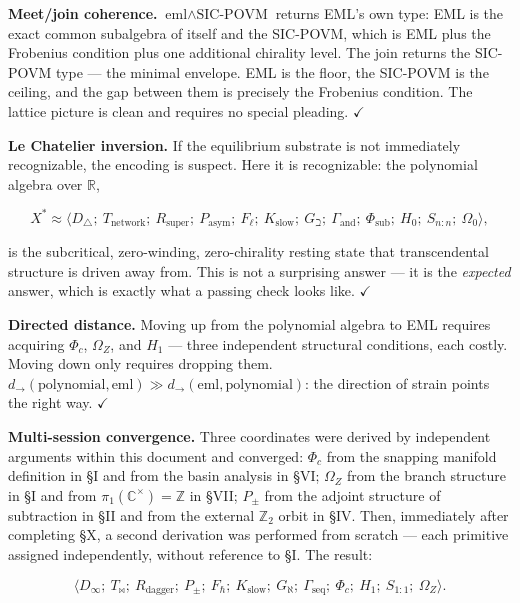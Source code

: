 \documentclass[12pt,a4paper]{article}
\newcommand{\pilcrow}{\S}
\begin{document}
\textbf{Meet/join coherence.} $\text{eml} \wedge \text{SIC-POVM}$ returns EML's own
type: EML is the exact common subalgebra of itself and the SIC-POVM, which is
EML plus the Frobenius condition plus one additional chirality level. The join
returns the SIC-POVM type --- the minimal envelope. EML is the floor, the SIC-POVM
is the ceiling, and the gap between them is precisely the Frobenius condition.
The lattice picture is clean and requires no special pleading. $\checkmark$

\textbf{Le Chatelier inversion.} If the equilibrium substrate is not immediately
recognizable, the encoding is suspect. Here it is recognizable: the polynomial
algebra over $\mathbb{R}$,


\[X^* \approx \langle D_{\triangle};\ T_\text{network};\ R_\text{super};\
P_\text{asym};\ F_{\ell};\ K_\text{slow};\ G_{\beth};\ \Gamma_\text{and};\
\Phi_\text{sub};\ H_0;\ S_{n:n};\ \Omega_0 \rangle,\]


is the subcritical, zero-winding, zero-chirality resting state that transcendental
structure is driven away from. This is not a surprising answer --- it is the
\emph{expected} answer, which is exactly what a passing check looks like. $\checkmark$

\textbf{Directed distance.} Moving up from the polynomial algebra to EML requires
acquiring $\Phi_c$, $\Omega_Z$, and $H_1$ --- three independent structural
conditions, each costly. Moving down only requires dropping them.
$d_{\to}(\text{polynomial}, \text{eml}) \gg d_{\to}(\text{eml}, \text{polynomial})$:
the direction of strain points the right way. $\checkmark$

\textbf{Multi-session convergence.} Three coordinates were derived by independent
arguments within this document and converged: $\Phi_c$ from the snapping manifold
definition in \pilcrow{}I and from the basin analysis in \pilcrow{}VI; $\Omega_Z$ from the branch
structure in \pilcrow{}I and from $\pi_1(\mathbb{C}^\times) = \mathbb{Z}$ in \pilcrow{}VII; $P_{\pm}$
from the adjoint structure of subtraction in \pilcrow{}II and from the external
$\mathbb{Z}_2$ orbit in \pilcrow{}IV. Then, immediately after completing \pilcrow{}X, a second
derivation was performed from scratch --- each primitive assigned independently,
without reference to \pilcrow{}I. The result:


\[\langle D_{\infty};\ T_{\bowtie};\ R_\text{dagger};\ P_{\pm};\ F_{\hbar};\
K_\text{slow};\ G_{\aleph};\ \Gamma_\text{seq};\ \Phi_c;\ H_1;\ S_{1:1};\
\Omega_Z \rangle.\]
\end{document}
